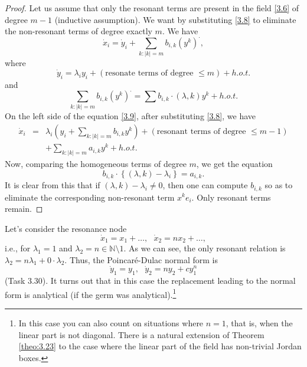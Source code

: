 \begin{theorem}
\begin{proof}
		Let us assume that only the resonant terms are present in the field \eqref{3.6} of degree $m-1$ (inductive assumption).  We want by substituting \eqref{3.8} to eliminate the non-resonant terms of degree exactly $m$. We have
		\begin{equation}
		\label{3.9}
		\dot{x}_{i}=\dot{y}_{i}+\sum_{k:\left\vert k\right\vert =m}b_{i,k}\left(
		y^{k}\right) ^{\cdot },
		\end{equation}%
		where
		$$
		\dot{y}_{i}=\lambda _{i}y_{i}+\left( \text{resonate terms of degree }\leq m\right)
		+h.o.t.
		$$%
		and
		$$
		\sum_{k:\left\vert k\right\vert =m}b_{i,k}\left( y^{k}\right) ^{\cdot }=\sum
		b_{i,k}\cdot \left( \lambda ,k\right) y^{k}+h.o.t.
		$$
		On the left side of the equation \eqref{3.9}, after substituting \eqref{3.8}, we have
		\begin{eqnarray*}
			\dot{x}_{i} &=&\lambda _{i}\left( y_{i}+\sum_{k:\left\vert k\right\vert
				=m}b_{i,k}y^{k}\right) +\left( \text{resonant terms of degree }\leq m-1\right) \\
			&&+\sum_{k:\left\vert k\right\vert =m}a_{i,k}y^{k}+h.o.t.
		\end{eqnarray*}
	Now, comparing the homogeneous terms of degree $m$, we get the equation$$
	b_{i,k}\cdot \left\{ (\lambda ,k)-\lambda _{i}\right\} =a_{i,k}.
	$$
	It is clear from this that if $\left( \lambda ,k\right) -\lambda _{i}\not=0$, then one can compute $b_{i,k}$ so as to eliminate the corresponding non-resonant term $x^{k}e_{i}$. Only resonant terms remain.
	\end{proof}
\end{theorem}

\begin{example}
	Let's consider the resonance node
	$$
	\dot{x}_{1}=x_{1}+\ldots ,\text{ \ \ }\dot{x}_{2}=nx_{2}+\ldots ,
	$$
	i.e., for $\lambda _{1}=1$ and $\lambda _{2}=n\in \mathbb{N}\setminus 1$. As we can see, the only resonant relation is $\lambda
	_{2}=n\lambda _{1}+0\cdot \lambda _{2}$. Thus, the Poincaré-Dulac normal form is
	$$
	\dot{y}_{1}=y_{1},\text{ \ \ }\dot{y}_{2}=ny_{2}+cy_{1}^{n}
	$$%
	(Task 3.30). It turns out that in this case the replacement leading to the normal form is analytical (if the germ was analytical).\footnote{In this case you can also count on situations where $n = 1$, that is, when the linear part is not diagonal. There is a natural extension of Theorem \ref{theo:3.23} to the case where the linear part of the field has non-trivial Jordan boxes.}
\end{example}

